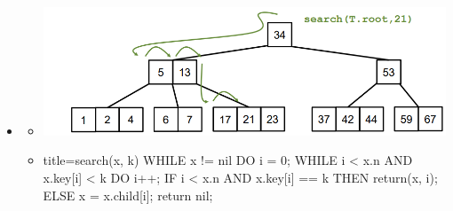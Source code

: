 \documentclass[
    12pt,
    a4paper,
    ngerman,
    color=3b,%
    marginpar=false,
    colorback=false,
    leqno,
]{tudaexercise}
\begin{document}
\begin{itemize}
        \item {}
            \begin{itemize}
                \item[] \includegraphics[width=12cm]{pictures/bbaumSuche.PNG}
                \item[]
                    \begin{ccode}[autogobble]{title={search(x, k)}}
                    WHILE x != nil DO
                        i = 0;
                        WHILE i < x.n AND x.key[i] < k DO
                            i++;
                        IF i < x.n AND x.key[i] == k THEN
                            return(x, i);
                        ELSE
                            x = x.child[i];
                    return nil;
                    \end{ccode}
            \end{itemize}

\pagebreak


\end{itemize}
\end{document}
